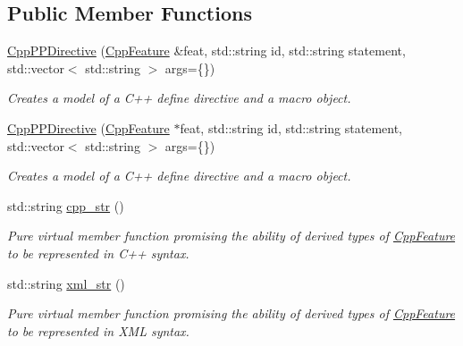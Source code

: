 \subsection*{Public Member Functions}
\begin{DoxyCompactItemize}
\item 
\hyperlink{classsheila_1_1cpp_1_1CppPPDirective_3_01CppPPDirectiveType_1_1DEFINE_01_4_a1511e565d049576911f8d04ce9628fad}{Cpp\+P\+P\+Directive} (\hyperlink{classsheila_1_1cpp_1_1CppFeature}{Cpp\+Feature} \&feat, std\+::string id, std\+::string statement, std\+::vector$<$ std\+::string $>$ args=\{\})
\begin{DoxyCompactList}\small\item\em Creates a model of a C++ define directive and a macro object. \end{DoxyCompactList}\item 
\hyperlink{classsheila_1_1cpp_1_1CppPPDirective_3_01CppPPDirectiveType_1_1DEFINE_01_4_a1b42adaa10edae5316be28b159485e35}{Cpp\+P\+P\+Directive} (\hyperlink{classsheila_1_1cpp_1_1CppFeature}{Cpp\+Feature} $\ast$feat, std\+::string id, std\+::string statement, std\+::vector$<$ std\+::string $>$ args=\{\})
\begin{DoxyCompactList}\small\item\em Creates a model of a C++ define directive and a macro object. \end{DoxyCompactList}\item 
std\+::string \hyperlink{classsheila_1_1cpp_1_1CppPPDirective_3_01CppPPDirectiveType_1_1DEFINE_01_4_a5fccebd381eeb594c6249eb2a0c70151}{cpp\+\_\+str} ()
\begin{DoxyCompactList}\small\item\em Pure virtual member function promising the ability of derived types of {\ttfamily \hyperlink{classsheila_1_1cpp_1_1CppFeature}{Cpp\+Feature}} to be represented in C++ syntax. \end{DoxyCompactList}\item 
std\+::string \hyperlink{classsheila_1_1cpp_1_1CppPPDirective_3_01CppPPDirectiveType_1_1DEFINE_01_4_ab46d249d848db43b0b0e4d28ea407bf3}{xml\+\_\+str} ()
\begin{DoxyCompactList}\small\item\em Pure virtual member function promising the ability of derived types of {\ttfamily \hyperlink{classsheila_1_1cpp_1_1CppFeature}{Cpp\+Feature}} to be represented in X\+ML syntax. \end{DoxyCompactList}\end{DoxyCompactItemize}


